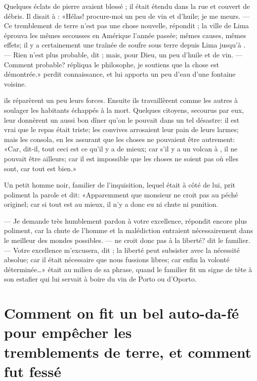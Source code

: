 Quelques éclats de pierre avaient blessé ; il était étendu dans
la rue et couvert de débris. Il disait à : «Hélas! procure-moi
un peu de vin et d’huile; je me meurs. — Ce tremblement de terre n’est
pas une chose nouvelle, répondit ; la ville de Lima éprouva les
mêmes secousses en Amérique l’année passée; mêmes causes, mêmes effets;
il y a certainement une traînée de soufre sous terre depuis Lima
jusqu’à . — Rien n’est plus probable, dit ; mais, pour
Dieu, un peu d’huile et de vin. — Comment probable? répliqua le
philosophe, je soutiens que la chose est démontrée.»  perdit
connaissance, et  lui apporta un peu d’eau d’une fontaine
voisine.

 ils réparèrent un peu leurs forces. Ensuite
ils travaillèrent comme les autres à soulager les habitants échappés à
la mort. Quelques citoyens, secourus par eux, leur donnèrent un aussi
bon dîner qu’on le pouvait dans un tel désastre: il est vrai que le
repas était triste; les convives arrosaient leur pain de leurs larmes;
mais  les consola, en les assurant que les choses ne pouvaient
être autrement: «Car, dit-il, tout ceci est ce qu’il y a de mieux; car
s’il y a un volcan à , il ne pouvait être ailleurs; car il est
impossible que les choses ne soient pas où elles sont, car tout est
bien.»


Un petit homme noir, familier de l’inquisition, lequel était à côté de
lui, prit poliment la parole et dit: «Apparemment que monsieur ne croit
pas au péché originel; car si tout est au mieux, il n’y a donc eu ni
chute ni punition. 

— Je demande très humblement pardon à votre excellence, répondit 
encore plus poliment, car la chute de l’homme et la malédiction
entraient nécessairement dans le meilleur des mondes possibles.
—  ne croit donc pas à la liberté? dit le familier. — Votre
excellence m’excusera, dit ; la liberté peut subsister avec la
nécessité absolue; car il était nécessaire que nous fussions libres;
car enfin la volonté déterminée…»  était au milieu de sa
phrase, quand le familier fit un signe de tête à son estafier qui lui
servait à boire du vin de Porto ou d’Oporto.





\chapter[Comment on fit un bel auto-da-fé…]{Comment on fit un bel auto-da-fé pour empêcher les\\tremblements de
terre, et comment  fut fessé}


